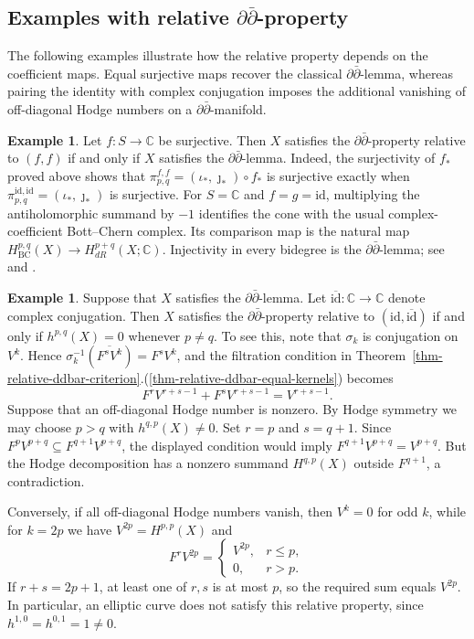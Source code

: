 \documentclass[11pt]{amsart}
\numberwithin{equation}{section}
\theoremstyle{plain}
\theoremstyle{definition}
\newtheorem{Ex}[thm]{Example}
\begin{document}
\subsection{Examples with relative \texorpdfstring{$\partial\bar\partial$}{partial-bar-partial}-property}

The following examples illustrate how the relative property depends on
the coefficient maps. Equal surjective maps recover the classical
$\partial\bar\partial$-lemma, whereas pairing the identity with complex
conjugation imposes the additional vanishing of off-diagonal Hodge
numbers on a $\partial\bar\partial$-manifold.

\begin{Ex}\label{ex-relative-equal-maps}
Let $f:S\longrightarrow\mathbb C$ be surjective. Then $X$ satisfies
the $\partial\bar\partial$-property relative to $(f,f)$ if and only if
$X$ satisfies the $\partial\bar\partial$-lemma. Indeed, the surjectivity of $f_*$ proved above shows that
$\pi_{p,q}^{f,f}=(\iota_*,\jmath_*)\circ f_*$ is surjective exactly when
$\pi_{p,q}^{\mathrm{id},\mathrm{id}}=(\iota_*,\jmath_*)$ is surjective.
For $S=\mathbb C$ and $f=g=\mathrm{id}$, multiplying the antiholomorphic
summand by $-1$ identifies the cone with the usual complex-coefficient
Bott--Chern complex. Its comparison map is the natural map
$H^{p,q}_{\mathrm{BC}}(X)\to H^{p+q}_{dR}(X;\mathbb C)$.
Injectivity in every bidegree is the
$\partial\bar\partial$-lemma; see \cite[\S~1]{Sch} and \cite[\S~2]{S1}.
\end{Ex}

\begin{Ex}\label{ex-relative-conjugation}
Suppose that $X$ satisfies the $\partial\bar\partial$-lemma.
Let $\overline{\mathrm{id}}:\mathbb C\to\mathbb C$ denote complex
conjugation. Then $X$ satisfies the $\partial\bar\partial$-property
relative to $(\mathrm{id},\overline{\mathrm{id}})$ if and only if
$h^{p,q}(X)=0$ whenever $p\ne q$.
To see this, note that $\sigma_k$ is conjugation on $V^k$. Hence
$\sigma_k^{-1}(\overline{F^sV^k})=F^sV^k$, and the filtration condition
in Theorem~\ref{thm-relative-ddbar-criterion}.(\ref{thm-relative-ddbar-equal-kernels}) becomes
\[
F^rV^{r+s-1}+F^sV^{r+s-1}=V^{r+s-1}.
\]
Suppose that an off-diagonal Hodge number is nonzero. By Hodge symmetry
we may choose $p>q$ with $h^{q,p}(X)\ne0$. Set $r=p$ and $s=q+1$.
Since $F^pV^{p+q}\subseteq F^{q+1}V^{p+q}$, the displayed condition
would imply $F^{q+1}V^{p+q}=V^{p+q}$. But the Hodge decomposition has
a nonzero summand $H^{q,p}(X)$ outside $F^{q+1}$, a contradiction.

Conversely, if all off-diagonal Hodge numbers vanish, then $V^k=0$
for odd $k$, while for $k=2p$ we have $V^{2p}=H^{p,p}(X)$ and
\[
F^rV^{2p}=\begin{cases}V^{2p},&r\le p,\\0,&r>p.\end{cases}
\]
If $r+s=2p+1$, at least one of $r,s$ is at most $p$, so the required
sum equals $V^{2p}$. In particular, an elliptic curve does not satisfy
this relative property, since $h^{1,0}=h^{0,1}=1\ne0$.
\end{Ex}
\end{document}
